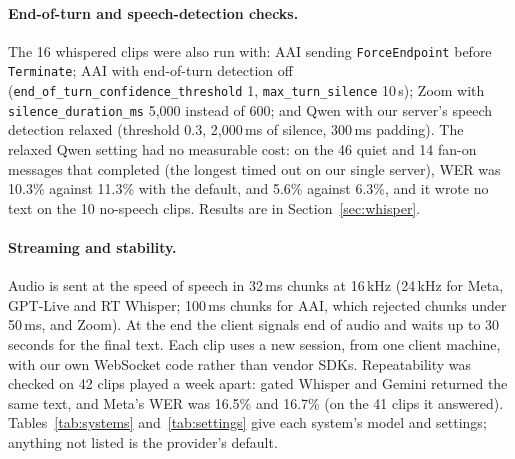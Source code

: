 \documentclass[11pt]{article}
\begin{document}
\paragraph{End-of-turn and speech-detection checks.} The 16 whispered clips were also run with: AAI sending \texttt{ForceEndpoint} before \texttt{Terminate}; AAI with end-of-turn detection off (\texttt{end\_of\_turn\_\allowbreak confidence\_threshold} 1, \texttt{max\_turn\_\allowbreak silence} 10\,s); Zoom with \texttt{silence\_\allowbreak duration\_ms} 5{,}000 instead of 600; and Qwen with our server's speech detection relaxed (threshold 0.3, 2{,}000\,ms of silence, 300\,ms padding). The relaxed Qwen setting had no measurable cost: on the 46 quiet and 14 fan-on messages that completed (the longest timed out on our single server), WER was 10.3\% against 11.3\% with the default, and 5.6\% against 6.3\%, and it wrote no text on the 10 no-speech clips. Results are in Section~\ref{sec:whisper}.

\paragraph{Streaming and stability.} Audio is sent at the speed of speech in 32\,ms chunks at 16\,kHz (24\,kHz for Meta, GPT-Live and RT Whisper; 100\,ms chunks for AAI, which rejected chunks under 50\,ms, and Zoom). At the end the client signals end of audio and waits up to 30 seconds for the final text. Each clip uses a new session, from one client machine, with our own WebSocket code rather than vendor SDKs. Repeatability was checked on 42 clips played a week apart: gated Whisper and Gemini returned the same text, and Meta's WER was 16.5\% and 16.7\% (on the 41 clips it answered). Tables~\ref{tab:systems} and~\ref{tab:settings} give each system's model and settings; anything not listed is the provider's default.
\end{document}

